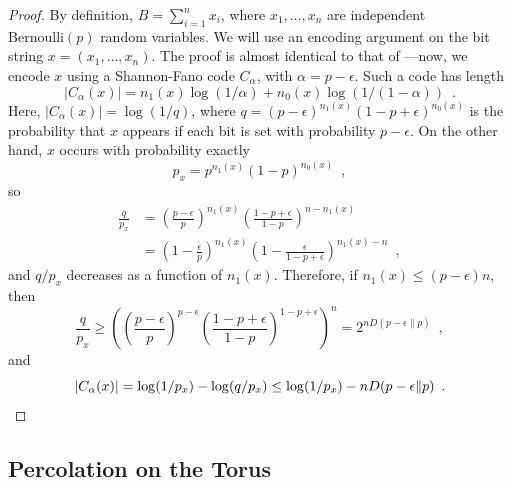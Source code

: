 \documentclass{patmorin}
\begin{document}
\begin{proof}
  By definition, $B=\sum_{i=1}^n x_i$, where $x_1,\ldots,x_n$ are
  independent $\mathrm{Bernoulli}(p)$ random variables.  We will use
  an encoding argument on the bit string $x=(x_1,\ldots,x_n)$. The
  proof is almost identical to that of ---now,
  we encode $x$ using a Shannon-Fano code $C_\alpha$, with $\alpha = p
  - \epsilon$. Such a code has length
  \[
  |C_\alpha(x)| = n_1(x) \log (1/\alpha) + n_0(x) \log (1/(1 - \alpha)) \enspace .
  \]
  Here, $|C_\alpha(x)| = \log (1/q)$, where $q = (p -
  \epsilon)^{n_1(x)} (1 - p + \epsilon)^{n_0(x)}$ is the probability
  that $x$ appears if each bit is set with probability $p -
  \epsilon$. On the other hand, $x$ occurs with probability exactly
  \[
  p_x = p^{n_1(x)} (1 - p)^{n_0(x)} \enspace ,
  \]
  so
  \begin{align*}
    \frac{q}{p_x} &= \left(\frac{p - \epsilon}{p}\right)^{n_1(x)} \left(\frac{1 - p + \epsilon}{1 - p}\right)^{n - n_1(x)} \\
    &= \left(1 - \frac{\epsilon}{p}\right)^{n_1(x)} \left(1 -
      \frac{\epsilon}{1 - p + \epsilon}\right)^{n_1(x) - n} \enspace ,
  \end{align*}
  and $q/p_x$ decreases as a function of $n_1(x)$. Therefore, if
  $n_1(x) \le (p - \epsilon)n$, then
  \[
  \frac{q}{p_x} \ge \left(\left(\frac{p - \epsilon}{p}\right)^{p -
      \epsilon} \left(\frac{1 - p + \epsilon}{1 - p}\right)^{1 - p +
      \epsilon}\right)^n = 2^{n D(p - \epsilon \| p)} \enspace ,
  \]
  and
  \[
  |C_\alpha(x)| = \log (1/p_x) - \log (q/p_x) \leq \log (1/p_x) - n
  D(p - \epsilon \| p) \enspace . \qedhere
  \]
\end{proof}

\subsection{Percolation on the Torus}
\end{document}
